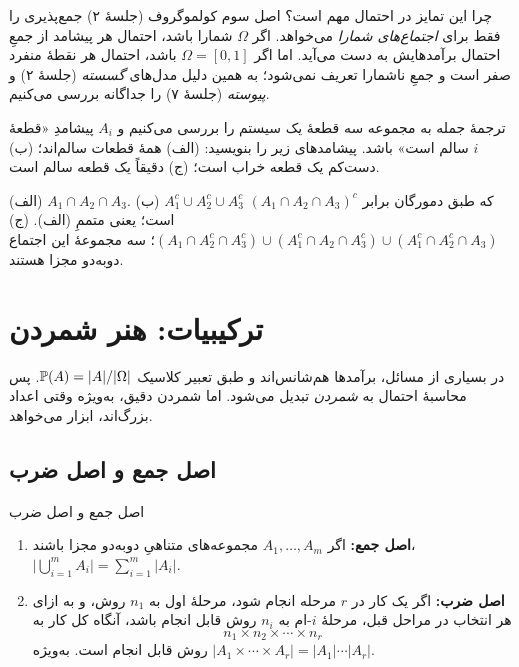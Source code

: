 \begin{note}
چرا این تمایز در احتمال مهم است؟ اصل سوم کولموگروف (جلسهٔ ۲) جمع‌پذیری را فقط برای \emph{اجتماع‌های شمارا} می‌خواهد. اگر $\Omega$ شمارا باشد، احتمال هر پیشامد از جمعِ احتمال برآمدهایش به دست می‌آید. اما اگر $\Omega=[0,1]$ باشد، احتمال هر نقطهٔ منفرد صفر است و جمعِ ناشمارا تعریف نمی‌شود؛ به همین دلیل مدل‌های \emph{گسسته} (جلسهٔ ۲) و \emph{پیوسته} (جلسهٔ ۷) را جداگانه بررسی می‌کنیم.
\end{note}



\begin{example}{ترجمهٔ جمله به مجموعه}
سه قطعهٔ یک سیستم را بررسی می‌کنیم و $A_i$ پیشامدِ «قطعهٔ $i$ سالم است» باشد. پیشامدهای زیر را بنویسید:
(الف) همهٔ قطعات سالم‌اند؛ (ب) دست‌کم یک قطعه خراب است؛ (ج) دقیقاً یک قطعه سالم است.
\begin{solution}
(الف) $A_1\cap A_2\cap A_3$. \quad
(ب) $A_1^c\cup A_2^c\cup A_3^c$ که طبق دمورگان برابر $(A_1\cap A_2\cap A_3)^c$ است؛ یعنی متممِ (الف).\quad
(ج) $(A_1\cap A_2^c\cap A_3^c)\cup(A_1^c\cap A_2\cap A_3^c)\cup(A_1^c\cap A_2^c\cap A_3)$؛ سه مجموعهٔ این اجتماع دوبه‌دو مجزا هستند.
\end{solution}
\end{example}

\section{ترکیبیات: هنر شمردن}
\label{sec:counting}

در بسیاری از مسائل، برآمدها هم‌شانس‌اند و طبق تعبیر کلاسیک $\P(A)=|A|/|\Omega|$. پس محاسبهٔ احتمال به \emph{شمردن} تبدیل می‌شود. اما شمردن دقیق، به‌ویژه وقتی اعداد بزرگ‌اند، ابزار می‌خواهد.

\subsection{اصل جمع و اصل ضرب}

\begin{theorem}[label=thm:mult-principle]{اصل جمع و اصل ضرب}
\begin{enumerate}
  \item \textbf{اصل جمع:} اگر $A_1,\dots,A_m$ مجموعه‌های متناهیِ دوبه‌دو مجزا باشند، $\bigl|\bigcup_{i=1}^m A_i\bigr|=\sum_{i=1}^m |A_i|$.
  \item \textbf{اصل ضرب:} اگر یک کار در $r$ مرحله انجام شود، مرحلهٔ اول به $n_1$ روش، و به ازای هر انتخاب در مراحل قبل، مرحلهٔ $i$-ام به $n_i$ روش قابل انجام باشد، آنگاه کل کار به
  \[ n_1\times n_2\times\cdots\times n_r \]
  روش قابل انجام است. به‌ویژه $|A_1\times\cdots\times A_r|=|A_1|\cdots|A_r|$.
\end{enumerate}
\end{theorem}

